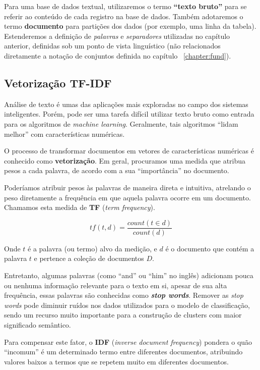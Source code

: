  Para uma base de dados textual,  utilizaremos o termo \textbf{``texto bruto''}  para se referir ao conteúdo de cada registro na base de dados. 
 Também adotaremos o termo \textbf{documento} para partições dos dados (por exemplo, uma linha da tabela).
 Estenderemos a definição de \emph{palavras} e \emph{separadores} utilizadas no capítulo anterior, definidas sob um ponto de vista linguístico (não relacionados diretamente a notação de conjuntos definida no capítulo ~\ref{chapter:fund}).
 
 \subsection{Vetorização TF-IDF}
Análise de texto é umas das aplicações mais exploradas no campo dos sistemas inteligentes.
Porém, pode ser uma tarefa difícil utilizar texto bruto como entrada para os algoritmos de \emph{machine learning}. 
Geralmente, tais algoritmos ``lidam melhor'' com características numéricas.
 
O processo de transformar documentos em vetores de características numéricas é conhecido como \textbf{vetorização}. 
Em geral, procuramos uma medida que atribua pesos a cada palavra, de acordo com a sua ``importância'' no documento.

Poderíamos atribuir pesos às palavras de maneira direta e intuitiva, atrelando o peso diretamente a frequência em que aquela palavra ocorre em um documento.
Chamamos esta medida de \textbf{TF} (\emph{term frequency}).

\begin{equation}\label{eq:tf}
tf(t, d) = \frac{count(t \in d)}{count(d)}
\end{equation}

Onde $t$ é a palavra (ou termo) alvo da medição, e $d$ é o documento que contém a palavra $t$  e pertence a coleção de documentos $D$.

Entretanto, algumas palavras (como ``and'' ou ``him'' no inglês) adicionam pouca ou nenhuma informação relevante para o texto em si, apesar de sua alta frequência, essas palavras são conhecidas como \textbf{\emph{stop words}}.
Remover as \emph{stop words} pode diminuir ruídos nos dados utilizados para o modelo de classificação, sendo um recurso muito importante para a construção de clusters com maior significado semântico.

Para compensar este fator, o \textbf{IDF} (\emph{inverse document frequency}) pondera o quão ``incomum'' é um determinado termo entre diferentes documentos, atribuindo valores baixos a termos que se repetem muito em diferentes documentos.

